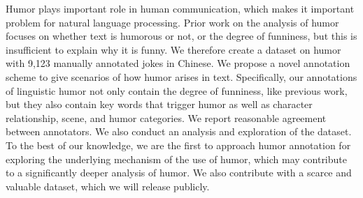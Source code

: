 Humor plays important role in human communication, which makes it important problem for natural language processing. Prior work on the analysis of humor focuses on whether text is humorous or not, or the degree of funniness, but this is insufficient to explain why it is funny. We therefore create a dataset on humor with 9,123 manually annotated jokes in Chinese. We propose a novel annotation scheme to give scenarios of how humor arises in text. Specifically, our annotations of linguistic humor not only contain the degree of funniness, like previous work, but they also contain key words that trigger humor as well as character relationship, scene, and humor categories. We report reasonable agreement between annotators. We also conduct an analysis and exploration of the dataset. To the best of our knowledge, we are the first to approach humor annotation for exploring the underlying mechanism of the use of humor, which may contribute to a significantly deeper analysis of humor. We also contribute with a scarce and valuable dataset, which we will release publicly.